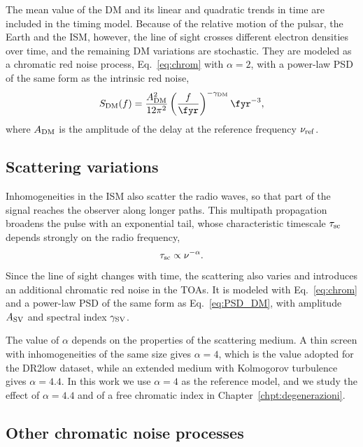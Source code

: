 The mean value of the DM and its linear and quadratic trends in time are
included in the timing model. Because of the relative motion of the pulsar,
the Earth and the ISM, however, the line of sight crosses different electron
densities over time, and the remaining DM variations are stochastic. They are
modeled as a chromatic red noise process, Eq.~\eqref{eq:chrom} with
$\alpha = 2$, with a power-law PSD of the same form as the intrinsic red noise,
\begin{equation}
    S_{\rm DM}(f) = \frac{A_{\rm DM}^2}{12\pi^2}
    \left(\frac{f}{\fyr}\right)^{-\gamma_{\rm DM}}\fyr^{-3},
    \label{eq:PSD_DM}
\end{equation}
where $A_{\rm DM}$ is the amplitude of the delay at the reference frequency
$\nu_{\rm ref}$.

\subsection{Scattering variations} \label{sec:sv}

Inhomogeneities in the ISM also scatter the radio waves, so that part of the
signal reaches the observer along longer paths. This multipath propagation
broadens the pulse with an exponential tail, whose characteristic timescale
$\tau_{\rm sc}$ depends strongly on the radio frequency,
\begin{equation}
    \tau_{\rm sc} \propto \nu^{-\alpha}.
    \label{eq:scattering}
\end{equation}
Since the line of sight changes with time, the scattering also varies and
introduces an additional chromatic red noise in the TOAs. It is modeled with
Eq.~\eqref{eq:chrom} and a power-law PSD of the same form as
Eq.~\eqref{eq:PSD_DM}, with amplitude $A_{\rm SV}$ and spectral index
$\gamma_{\rm SV}$.

The value of $\alpha$ depends on the properties of the scattering medium. A
thin screen with inhomogeneities of the same size gives $\alpha = 4$, which is
the value adopted for the DR2low dataset, while an extended medium with
Kolmogorov turbulence gives $\alpha = 4.4$. In this work we use $\alpha = 4$ as
the reference model, and we study the effect of $\alpha = 4.4$ and of a free
chromatic index in Chapter~\ref{chpt:degenerazioni}.

\subsection{Other chromatic noise processes} \label{sec:altri_chrom}

